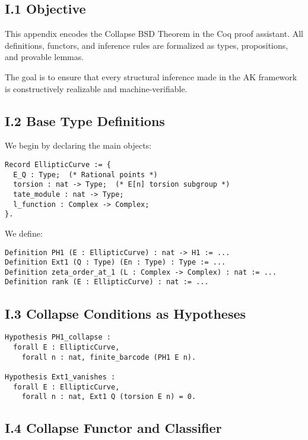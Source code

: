 \documentclass[11pt]{article}
\begin{document}
\subsection*{I.1 Objective}

This appendix encodes the Collapse BSD Theorem in the Coq proof assistant.  
All definitions, functors, and inference rules are formalized as types, propositions, and provable lemmas.

The goal is to ensure that every structural inference made in the AK framework is constructively realizable and machine-verifiable.

\subsection*{I.2 Base Type Definitions}

We begin by declaring the main objects:

\begin{lstlisting}[language=Coq]
Record EllipticCurve := {
  E_Q : Type;  (* Rational points *)
  torsion : nat -> Type;  (* E[n] torsion subgroup *)
  tate_module : nat -> Type;
  l_function : Complex -> Complex;
}.
\end{lstlisting}

We define:

\begin{lstlisting}
Definition PH1 (E : EllipticCurve) : nat -> H1 := ...
Definition Ext1 (Q : Type) (En : Type) : Type := ...
Definition zeta_order_at_1 (L : Complex -> Complex) : nat := ...
Definition rank (E : EllipticCurve) : nat := ...
\end{lstlisting}

\subsection*{I.3 Collapse Conditions as Hypotheses}

\begin{lstlisting}
Hypothesis PH1_collapse :
  forall E : EllipticCurve,
    forall n : nat, finite_barcode (PH1 E n).

Hypothesis Ext1_vanishes :
  forall E : EllipticCurve,
    forall n : nat, Ext1 Q (torsion E n) = 0.
\end{lstlisting}

\subsection*{I.4 Collapse Functor and Classifier}
\end{document}
